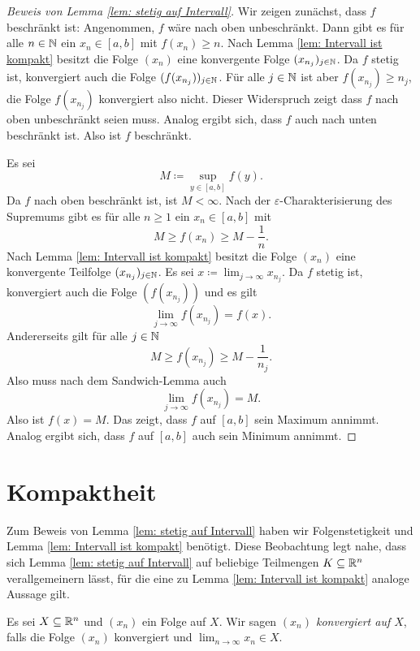 \documentclass[a4paper,10pt]{article}
\begin{document}
\begin{proof}[Beweis von Lemma \ref{lem: stetig auf Intervall}]
 Wir zeigen zunächst, dass $f$ beschränkt ist: Angenommen, $f$ wäre nach oben unbeschränkt. Dann gibt es für alle $n \in \mathbb{N}$ ein $x_n \in [a,b]$ mit $f(x_n) \geq n$. Nach Lemma \ref{lem: Intervall ist kompakt} besitzt die Folge $(x_n)$ eine konvergente Folge $(x_{n_j})_{j \in \mathbb{N}}$. Da $f$ stetig ist, konvergiert auch die Folge $(f(x_{n_j}))_{j \in \mathbb{N}}$. Für alle $j \in \mathbb{N}$ ist aber $f(x_{n_j}) \geq n_j$, die Folge $f(x_{n_j})$ konvergiert also nicht. Dieser Widerspruch zeigt dass $f$ nach oben unbeschränkt seien muss. Analog ergibt sich, dass $f$ auch nach unten beschränkt ist. Also ist $f$ beschränkt.
 
 Es sei
 \[
  M \coloneqq \sup_{y \in [a,b]} f(y).
 \]
 Da $f$ nach oben beschränkt ist, ist $M < \infty$. Nach der $\varepsilon$-Charakterisierung des Supremums gibt es für alle $n \geq 1$ ein $x_n \in [a,b]$ mit
 \[
  M \geq f(x_n) \geq M - \frac{1}{n}.
 \]
 Nach Lemma \ref{lem: Intervall ist kompakt} besitzt die Folge $(x_n)$ eine konvergente Teilfolge $(x_{n_j})_{j \in \mathbb{N}}$. Es sei $x \coloneq \lim_{j \to \infty} x_{n_j}$. Da $f$ stetig ist, konvergiert auch die Folge $(f(x_{n_j}))$ und es gilt
 \[
  \lim_{j \to \infty} f(x_{n_j}) = f(x).
 \]
 Andererseits gilt für alle $j \in \mathbb{N}$
 \[
  M \geq f(x_{n_j}) \geq M - \frac{1}{n_j}.
 \]
 Also muss nach dem Sandwich-Lemma auch
 \[
  \lim_{j \to \infty} f(x_{n_j}) = M.
 \]
 Also ist $f(x) = M$. Das zeigt, dass $f$ auf $[a,b]$ sein Maximum annimmt. Analog ergibt sich, dass $f$ auf $[a,b]$ auch sein Minimum annimmt.
\end{proof}





\section{Kompaktheit}


Zum Beweis von Lemma \ref{lem: stetig auf Intervall} haben wir Folgenstetigkeit und Lemma \ref{lem: Intervall ist kompakt} benötigt. Diese Beobachtung legt nahe, dass sich Lemma \ref{lem: stetig auf Intervall} auf beliebige Teilmengen $K \subseteq \mathbb{R}^n$ verallgemeinern lässt, für die eine zu Lemma \ref{lem: Intervall ist kompakt} analoge Aussage gilt.


\begin{defi}
 Es sei $X \subseteq \mathbb{R}^n$ und $(x_n)$ ein Folge auf $X$. Wir sagen \emph{$(x_n)$ konvergiert auf $X$}, falls die Folge $(x_n)$ konvergiert und $\lim_{n \to \infty} x_n \in X$.
\end{defi}
\end{document}
